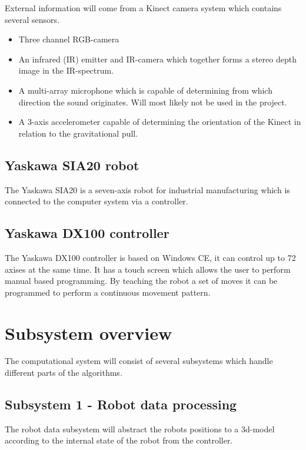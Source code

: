 \documentclass[10pt,a4paper,english]{article}
\begin{document}
External information will come from a Kinect camera system which contains several sensors.\cite{kinectref}

\begin{itemize}
\item Three channel RGB-camera
\item An infrared (IR) emitter and IR-camera which together forms a stereo depth image in the IR-spectrum.
\item A multi-array microphone which is capable of determining from which direction the sound originates. Will most likely not be used in the project.
\item A 3-axis accelerometer capable of determining the orientation of the Kinect in relation to the gravitational pull.
\end{itemize}

\subsection{Yaskawa SIA20 robot}

The Yaskawa SIA20 is a seven-axis robot for industrial manufacturing which is connected to the computer system via a controller.\cite{sia20}

\subsection{Yaskawa DX100 controller}

The Yaskawa DX100 controller is based on Windows CE, it can control up to 72 axises at the same time. It has a touch screen which allows the user to perform manual based programming. By teaching the robot a set of moves it can be programmed to perform a continuous movement pattern.

\section{Subsystem overview}

The computational system will consist of several subsystems which handle different parts of the algorithms.

\subsection{Subsystem 1 - Robot data processing}

The robot data subsystem will abstract the robots positions to a 3d-model according to the internal state of the robot from the controller.
\end{document}
